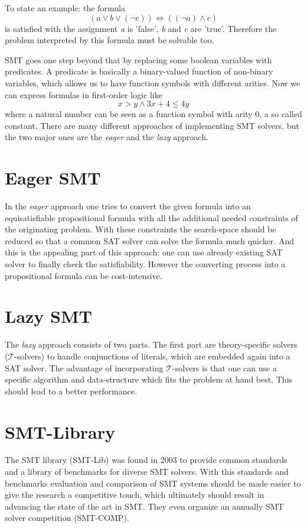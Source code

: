To state an example: the formula
\[(a \lor b \lor (\neg c)) \iff ((\neg a) \land c)\]
is satisfied with the assignment \textit{a} is 'false', \textit{b} and \textit{c} are 'true'. Therefore the problem interpreted by this formula must be solvable too.

SMT goes one step beyond that by replacing some boolean variables with predicates. A predicate is basically a binary-valued function of non-binary variables, which allows us to have function symbols with different arities. Now we can express formulas in first-order logic like
\[x > y \land 3 x + 4 \leq 4 y\]
where a natural number can be seen as a function symbol with arity 0, a so called constant.
There are many different approaches of implementing SMT solvers, but the two major ones are the \textit{eager} and the \textit{lazy} approach.

\section{Eager SMT}
In the \textit{eager} approach one tries to convert the given formula into an equisatisfiable propositional formula with all the additional needed constraints of the originating problem. With these constraints the search-space should be reduced so that a common SAT solver can solve the formula much quicker. And this is the appealing part of this approach: one can use already existing SAT solver to finally check the satisfiability. However the converting process into a propositional formula can be cost-intensive.\cite{2009satisfiability}

\section{Lazy SMT}
The \textit{lazy} approach consists of two parts. The first part are theory-specific solvers ($\mathcal{T}$-solvers) to handle conjunctions of literals, which are embedded again into a SAT solver. The advantage of incorporating $\mathcal{T}$-solvers is that one can use a specific algorithm and data-structure which fits the problem at hand best. This should lead to a better performance.\cite{sebastiani2007lazy}

\section{SMT-Library}
The SMT library (SMT-Lib) was found in 2003 to provide common standards and a library of benchmarks for diverse SMT solvers. With this standards and benchmarks evaluation and comparison of SMT systems should be made easier to give the research a competitive touch, which ultimately should result in advancing the state of the art in SMT. They even organize an annually SMT solver competition (SMT-COMP).

